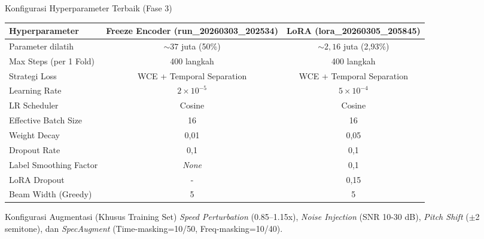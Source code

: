 \begin{frame}{Konfigurasi Hyperparameter Terbaik (Fase 3)}
    \begin{center}
        \scriptsize
        \begin{tabular}{lcc}
            \toprule
            \textbf{Hyperparameter} & \textbf{Freeze Encoder (run\_20260303\_202534)} & \textbf{LoRA (lora\_20260305\_205845)} \\
            \midrule
            Parameter dilatih & \(\sim 37\) juta (50\%) & \(\sim 2{,}16\) juta (2,93\%) \\
            Max Steps (per 1 Fold) & 400 langkah & 400 langkah \\
            Strategi Loss & WCE + Temporal Separation & WCE + Temporal Separation \\
            Learning Rate & \(2 \times 10^{-5}\) & \(5 \times 10^{-4}\) \\
            LR Scheduler & Cosine & Cosine \\
            Effective Batch Size & 16 & 16 \\
            Weight Decay & 0,01 & 0,05 \\
            Dropout Rate & 0,1 & 0,1 \\
            Label Smoothing Factor & \textit{None} & 0,1 \\
            LoRA Dropout & - & 0,15 \\
            Beam Width (Greedy) & 5 & 5 \\
            \bottomrule
        \end{tabular}
    \end{center}
    \vspace{0.2cm}
    \begin{block}{Konfigurasi Augmentasi (Khusus Training Set)}
        \scriptsize
        \textit{Speed Perturbation} (0.85--1.15x), \textit{Noise Injection} (SNR 10-30 dB), \textit{Pitch Shift} ($\pm$2 semitone), dan \textit{SpecAugment} (Time-masking=10/50, Freq-masking=10/40).
    \end{block}
\end{frame}